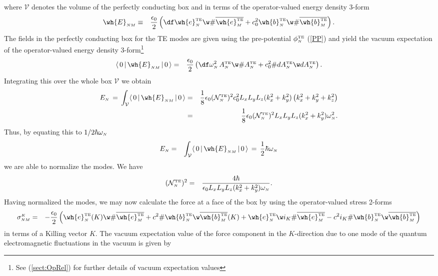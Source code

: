 \documentclass[sections]{tjwNOTES}
\newcommand\man[1]{\mathcal{#1}}
\newcommand\kx{k_{x}}
\newcommand\ky{k_{y}}
\newcommand\kz{k_{z}}
\newcommand\Lx{L_{x}}
\newcommand\Ly{L_{y}}
\newcommand\Lz{L_{z}}
\newcommand\N{\mbox{\tiny $N$}}
\renewcommand\M{\mbox{\tiny $M$}}
\newcommand\K{\mbox{\tiny $K$}}
\newcommand\TE{\mbox{\tiny TE}}
\newcommand\V{\man{V}}
\newcommand\VEV[1]{ \langle \, 0 \, | \, #1 \,| \, 0 \, \rangle }
\begin{document}
where $\V$ denotes the volume of the perfectly conducting box and in terms of the operator-valued energy density 3-form
\begin{eqnarray*}
    \wh{E}_{\N\M} &\equiv& \frac{\epsilon_{0}}{2}\left( \df \wh{e}^{\TE}_{\N} \w \# \overline{\wh{e}^{\TE}_{\M}} + c_{0}^{2}\wh{b}^{\TE}_{\N} \w \# \overline{\wh{b}^{\TE}_{\M}} \right).
\end{eqnarray*}
The fields in the perfectly conducting box for the TE modes are given using the pre-potential $\phi^{\TE}_{\N}$ (\ref{PP}) and yield the vacuum expectation of the operator-valued energy density 3-form\footnote{See (\ref{sect:OpRel}) for further details of vacuum expectation values}
\begin{eqnarray*}
    \VEV{\wh{E}_{\N\M} } &=& \frac{\epsilon_{0}}{2}\left( \df \omega_{\N}^{2}\,A^{\TE}_{\N} \w \# A^{\TE}_{\N} + c_{0}^{2}\# dA^{\TE}_{\N} \w dA^{\TE}_{\N} \right).
\end{eqnarray*}
Integrating this over the whole box $\V$ we obtain
\begin{eqnarray*}
    E_{\N} \,=\, \int_{\V}\VEV{\wh{E}_{\N\M} } &=& \frac{1}{8}\epsilon_{0}(\man{N}^{\TE}_{\N})^{2}c_{0}^{2}\Lx\Ly\Lz(\kx^{2} + \ky^{2})\left( \kx^{2} + \ky^{2} + \kz^{2}\right)\\ &=& \frac{1}{8}\epsilon_{0}(\man{N}^{\TE}_{\N})^{2}\Lx\Ly\Lz(\kx^{2} + \ky^{2})\omega_{\N}^{2}.
\end{eqnarray*}
Thus, by equating this to $1/2\hbar\omega_{\N}$
\begin{eqnarray*}
    E_{\N} &=& \int_{\V}\VEV{\wh{E}_{\N\M} } \,=\, \frac{1}{2}\hbar\omega_{\N}
\end{eqnarray*}
we are able to normalize the modes. We have
\begin{eqnarray}\label{norm}
    (\man{N}^{\TE}_{\N})^{2} &=& \frac{4\hbar}{\epsilon_{0}\Lx\Ly\Lz(\kx^{2} + \ky^{2})\omega_{\N}}.
\end{eqnarray}
Having normalized the modes, we may now calculate the force at a face of the box by using the operator-valued stress 2-forms
\begin{eqnarray*}
    \sigma^{\K}_{\N\M} &=& -\frac{\epsilon_{0}}{2}\left(  \wh{e}^{\TE}_{\N}(K) \w \# \overline{\wh{e}^{\TE}_{\M}} + c^{2}\#\wh{b}^{\TE}_{\N} \w  \overline{\wh{b}^{\TE}_{\M}}(K) + \wh{e}^{\TE}_{\N} \w i_{K}\# \overline{\wh{e}^{\TE}_{\M}} - c^{2}i_{K}\#\wh{b}^{\TE}_{\N} \w  \overline{\wh{b}^{\TE}_{\M}}  \right)
\end{eqnarray*}
in terms of a Killing vector $K$. The vacuum expectation value of the force component in the $K$-direction due to one mode of the quantum electromagnetic fluctuations in the vacuum is given by
\end{document}
